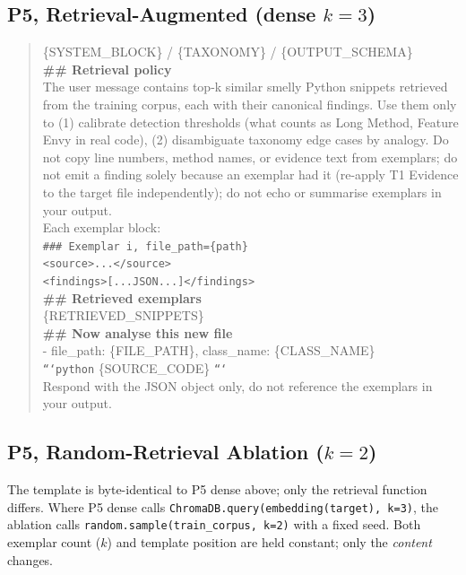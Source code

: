 \documentclass[conference]{IEEEtran}
\begin{document}
\subsection{P5, Retrieval-Augmented (dense $k{=}3$)}

\begin{quote}\small\ttfamily
\{SYSTEM\_BLOCK\} / \{TAXONOMY\} / \{OUTPUT\_SCHEMA\}\\[0.3em]
\textbf{\#\# Retrieval policy}\\
The user message contains top-k similar smelly Python snippets retrieved
from the training corpus, each with their canonical findings. Use them
only to (1) calibrate detection thresholds (what counts as Long Method,
Feature Envy in real code), (2) disambiguate taxonomy edge cases by
analogy. Do not copy line numbers, method names, or evidence text from
exemplars; do not emit a finding solely because an exemplar had it
(re-apply T1 Evidence to the target file independently); do not echo or
summarise exemplars in your output.\\[0.3em]
Each exemplar block:\\
\texttt{\#\#\# Exemplar i, file\_path=\{path\}}\\
\texttt{<source>...</source>}\\
\texttt{<findings>[...JSON...]</findings>}\\[0.3em]
\textbf{\#\# Retrieved exemplars}\\
\{RETRIEVED\_SNIPPETS\}\\[0.3em]
\textbf{\#\# Now analyse this new file}\\
- file\_path: \{FILE\_PATH\}, class\_name: \{CLASS\_NAME\}\\
\texttt{```python} \{SOURCE\_CODE\} \texttt{```}\\
Respond with the JSON object only, do not reference the exemplars in
your output.
\end{quote}

\subsection{P5, Random-Retrieval Ablation ($k{=}2$)}

\noindent The template is byte-identical to P5 dense above; only the
retrieval function differs. Where P5 dense calls
\texttt{ChromaDB.query(embedding(target), k=3)}, the ablation calls
\texttt{random.sample(train\_corpus, k=2)} with a fixed seed. Both
exemplar count ($k$) and template position are held constant; only the
\emph{content} changes.
\end{document}
